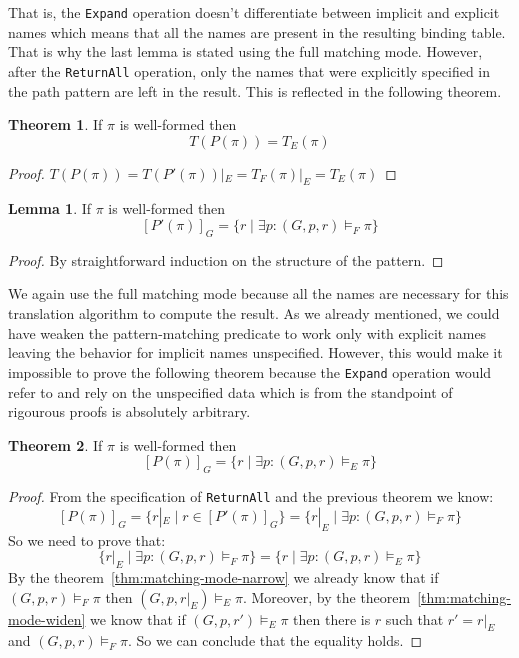 \documentclass[14pt]{constructor-thesis}
\theoremstyle{definition}
\newtheorem{theorem}{Theorem}
\newtheorem{lemma}{Lemma}
\begin{document}
That is, the \texttt{Expand} operation doesn't differentiate between implicit and explicit names which means that all the names are present in the resulting binding table. That is why the last lemma is stated using the full matching mode. However, after the \texttt{ReturnAll} operation, only the names that were explicitly specified in the path pattern are left in the result. This is reflected in the following theorem.

\begin{theorem}
  \label{thm:neo4j-translation-type}
  If $\pi$ is well-formed then
  $$T(P(\pi)) = T_E(\pi)$$
\end{theorem}
\begin{proof}
  $ T(P(\pi)) = T(P'(\pi))|_E = T_F(\pi)|_E = T_E(\pi) $
\end{proof}

\begin{lemma} If $\pi$ is well-formed then
  $$[P'(\pi)]_G = \{ r \mid \exists p : (G, p, r) \models_F \pi \}$$
\end{lemma}
\begin{proof}
  By straightforward induction on the structure of the pattern.
\end{proof}

We again use the full matching mode because all the names are necessary for this translation algorithm to compute the result. As we already mentioned, we could have weaken the pattern-matching predicate to work only with explicit names leaving the behavior for implicit names unspecified. However, this would make it impossible to prove the following theorem because the \texttt{Expand} operation would refer to and rely on the unspecified data which is from the standpoint of rigourous proofs is absolutely arbitrary.

\begin{theorem} If $\pi$ is well-formed then
  $$[P(\pi)]_G = \{ r \mid \exists p : (G, p, r) \models_E \pi \}$$
\end{theorem}
\begin{proof} From the specification of \texttt{ReturnAll} and the previous theorem we know:
  $$[P(\pi)]_G = \{ r|_E \mid r \in [P'(\pi)]_G \} = \{ r|_E \mid \exists p : (G, p, r) \models_F \pi \} $$
  So we need to prove that:
  $$ \{ r|_E \mid \exists p : (G, p, r) \models_F \pi \} = \{ r \mid \exists p : (G, p, r) \models_E \pi \} $$
  By the theorem~\ref{thm:matching-mode-narrow} we already know that if $(G, p, r) \models_F \pi$ then $(G, p, r |_E) \models_E \pi$. Moreover, by the theorem~\ref{thm:matching-mode-widen} we know that if $(G, p, r') \models_E \pi$ then there is $r$ such that $r' = r|_E$ and $(G, p, r) \models_F \pi$. So we can conclude that the equality holds.
\end{proof}
\end{document}
